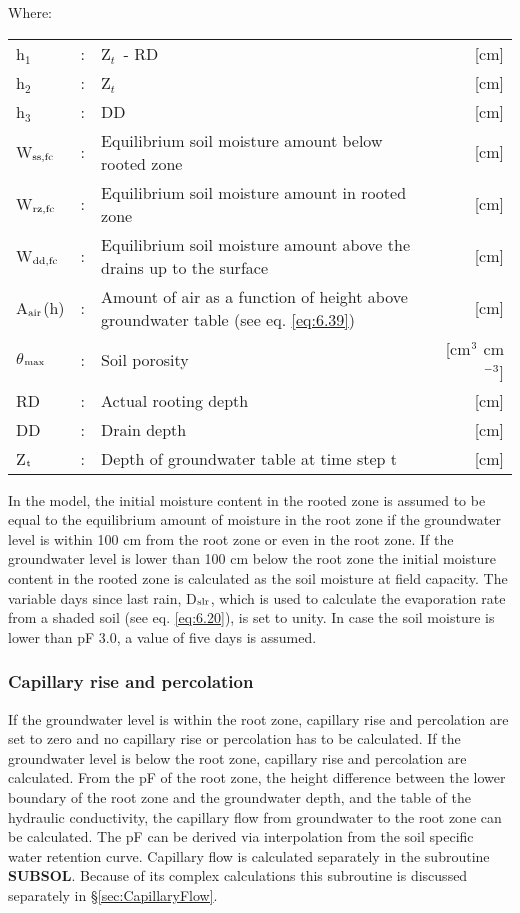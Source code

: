 Where:\\[5pt]
\begin{tabularx}{\textwidth}{llXr}
h$_{1}$ &:& Z$_{t~}$ - RD & [cm]\\
h$_{2}$ &:& Z$_{t}$  & [cm]\\
h$_{3}$ &:& DD  & [cm]\\

W$_{{\rm ss,fc}}$ &:& Equilibrium soil moisture amount below rooted zone  & [cm]\\
W$_{{\rm rz,fc}}$ &:& Equilibrium soil moisture amount in rooted zone  & [cm]\\
W$_{{\rm dd,fc}}$ &:& Equilibrium soil moisture amount above the drains up 
   to the surface  & [cm]\\
A$_{{\rm air}}$(h) &:& Amount of air as a function of height above groundwater
   table (see eq. \ref{eq:6.39})  & [cm]\\
$\theta$$_{{\rm max}}$ &:& Soil porosity  & [cm$^{{\rm 3}}$ cm$^{{\rm -3}}$]\\
RD &:& Actual rooting depth  & [cm]\\
DD &:& Drain depth  & [cm]\\
Z$_{{\rm t}}$ &:& Depth of groundwater table at time step t  & [cm]\\
\end{tabularx}

In the model, the initial moisture content in the rooted zone is assumed to be equal to the
equilibrium amount of moisture in the root zone if the groundwater level is within 100 cm
from the root zone or even in the root zone. If the groundwater level is lower than 100
cm below the root zone the initial moisture content in the rooted zone is calculated as the
soil moisture at field capacity. The variable days since last rain, D$_{{\rm slr}}$, which is used to
calculate the evaporation rate from a shaded soil (see eq. \ref{eq:6.20}), is set to unity. In case the
soil moisture is lower than pF 3.0, a value of five days is assumed.

\subsubsection{Capillary rise and percolation}
If the groundwater level is within the root zone, capillary rise and percolation are set to
zero and no capillary rise or percolation has to be calculated. 
If the groundwater level is below the root zone, capillary rise and percolation are
calculated. From the pF of the root zone, the height difference between the lower
boundary of the root zone and the groundwater depth, and the table of the hydraulic
conductivity, the capillary flow from groundwater to the root zone can be calculated. The
pF can be derived via interpolation from the soil specific water retention curve. Capillary
flow is calculated separately in the subroutine {\bf SUBSOL}. Because of its complex 
calculations this subroutine is discussed separately in \S \ref{sec:CapillaryFlow}. 


